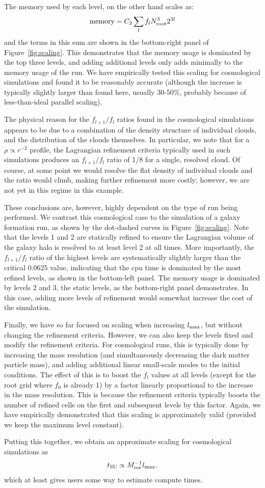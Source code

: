 The memory used by each level, on the other hand scales as:
\begin{equation}
{\rm memory} = C_2 \sum_l f_l N_{\rm root}^3 2^{3l}
\end{equation}
and the terms in this sum are shown in the bottom-right panel of Figure~\ref{fig:scaling}.  This demonstrates that the memory usage is dominated by the top three levels, and adding additional levels only adds minimally to the memory usage of the run.  We have empirically tested this scaling for cosmological simulations and found it to be reasonably accurate (although the increase is typically slightly larger than found here, usually 30-50\%, probably because of less-than-ideal parallel scaling).

The physical reason for the $f_{l+1}/f_l$ ratios found in the cosmological simulations appears to be due to a combination of the density structure of individual clouds, and the distribution of the clouds themselves.  In particular, we note that for a $\rho \propto r^{-2}$ profile, the Lagrangian refinement criteria typically used in such simulations produces an $f_{l+1}/f_l$ ratio of 1/8 for a single, resolved cloud.  Of course, at some point we would resolve the flat density of individual clouds and the ratio would climb, making further refinement more costly; however, we are not yet in this regime in this example.

These conclusions are, however, highly dependent on the type of run being performed.  We contrast this cosmological case to the simulation of a galaxy formation run, as shown by the dot-dashed curves in Figure~\ref{fig:scaling}.  Note that the levels 1 and 2 are statically refined to ensure the Lagrangian volume of the galaxy halo is resolved to at least level 2 at all times. More importantly, the $f_{l+1}/f_{l}$ ratio of the highest levels are systematically slightly larger than the critical 0.0625 value, indicating that the cpu time is dominated by the most refined levels, as shown in the bottom-left panel.  The memory usage is dominated by levels 2 and 3, the static levels, as the bottom-right panel demonstrates.  In this case, adding more levels of refinement would somewhat increase the cost of the simulation.

Finally, we have so far focused on scaling when increasing $l_{\rm max}$, but without changing the refinement criteria.  However, we can also keep the levels fixed and modify the refinement criteria.  For cosmological runs, this is typically done by increasing the mass resolution (and simultaneously decreasing the dark matter particle mass), and adding additional linear small-scale modes to the initial conditions.  The effect of this is to boost the $f_l$ values at all levels (except for the root grid where $f_0$ is already 1) by a factor linearly proportional to the increase in the mass resolution.  This is because the refinement criteria typically boosts the number of refined cells on the first and subsequent levels by this factor.  Again, we have empirically demonstrated that this scaling is approximately valid (provided we keep the maximum level constant).

Putting this together, we obtain an approximate scaling for cosmological simulations as 
\begin{equation}
t_{\rm SU} \propto M_{\rm res}^{-1} l_{\rm max}.
\end{equation}
which at least gives users some way to estimate compute times.

